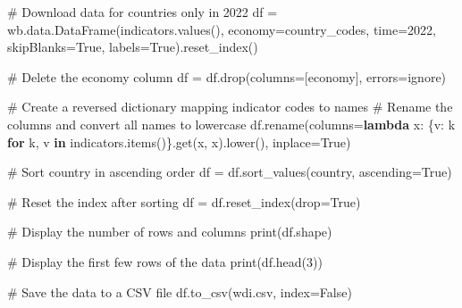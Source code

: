 \documentclass[
  letterpaper,
  DIV=11,
  numbers=noendperiod]{scrartcl}
\newenvironment{Shaded}{\begin{snugshade}}{\end{snugshade}}
\newcommand{\BuiltInTok}[1]{\textcolor[rgb]{0.00,0.23,0.31}{#1}}
\newcommand{\CommentTok}[1]{\textcolor[rgb]{0.37,0.37,0.37}{#1}}
\newcommand{\ControlFlowTok}[1]{\textcolor[rgb]{0.00,0.23,0.31}{\textbf{#1}}}
\newcommand{\DecValTok}[1]{\textcolor[rgb]{0.68,0.00,0.00}{#1}}
\newcommand{\KeywordTok}[1]{\textcolor[rgb]{0.00,0.23,0.31}{\textbf{#1}}}
\newcommand{\NormalTok}[1]{\textcolor[rgb]{0.00,0.23,0.31}{#1}}
\newcommand{\OperatorTok}[1]{\textcolor[rgb]{0.37,0.37,0.37}{#1}}
\newcommand{\StringTok}[1]{\textcolor[rgb]{0.13,0.47,0.30}{#1}}
\newcommand{\VariableTok}[1]{\textcolor[rgb]{0.07,0.07,0.07}{#1}}
\begin{document}
\begin{Shaded}
\begin{Highlighting}[]
\CommentTok{\# Download data for countries only in 2022}
\NormalTok{df }\OperatorTok{=}\NormalTok{ wb.data.DataFrame(indicators.values(), economy}\OperatorTok{=}\NormalTok{country\_codes, time}\OperatorTok{=}\DecValTok{2022}\NormalTok{, skipBlanks}\OperatorTok{=}\VariableTok{True}\NormalTok{, labels}\OperatorTok{=}\VariableTok{True}\NormalTok{).reset\_index()}

\CommentTok{\# Delete the \textquotesingle{}economy\textquotesingle{} column}
\NormalTok{df }\OperatorTok{=}\NormalTok{ df.drop(columns}\OperatorTok{=}\NormalTok{[}\StringTok{\textquotesingle{}economy\textquotesingle{}}\NormalTok{], errors}\OperatorTok{=}\StringTok{\textquotesingle{}ignore\textquotesingle{}}\NormalTok{)}

\CommentTok{\# Create a reversed dictionary mapping indicator codes to names}
\CommentTok{\# Rename the columns and convert all names to lowercase}
\NormalTok{df.rename(columns}\OperatorTok{=}\KeywordTok{lambda}\NormalTok{ x: \{v: k }\ControlFlowTok{for}\NormalTok{ k, v }\KeywordTok{in}\NormalTok{ indicators.items()\}.get(x, x).lower(), inplace}\OperatorTok{=}\VariableTok{True}\NormalTok{)}

\CommentTok{\# Sort \textquotesingle{}country\textquotesingle{} in ascending order}
\NormalTok{df }\OperatorTok{=}\NormalTok{ df.sort\_values(}\StringTok{\textquotesingle{}country\textquotesingle{}}\NormalTok{, ascending}\OperatorTok{=}\VariableTok{True}\NormalTok{)}

\CommentTok{\# Reset the index after sorting}
\NormalTok{df }\OperatorTok{=}\NormalTok{ df.reset\_index(drop}\OperatorTok{=}\VariableTok{True}\NormalTok{)}

\CommentTok{\# Display the number of rows and columns}
\BuiltInTok{print}\NormalTok{(df.shape)}

\CommentTok{\# Display the first few rows of the data}
\BuiltInTok{print}\NormalTok{(df.head(}\DecValTok{3}\NormalTok{))}

\CommentTok{\# Save the data to a CSV file}
\NormalTok{df.to\_csv(}\StringTok{\textquotesingle{}wdi.csv\textquotesingle{}}\NormalTok{, index}\OperatorTok{=}\VariableTok{False}\NormalTok{)}
\end{Highlighting}
\end{Shaded}
\end{document}
